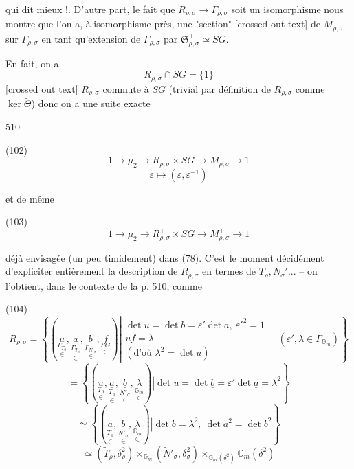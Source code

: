 \begin{enumerate}
qui dit mieux !. D'autre part, le fait
que $R_{\rho,\sigma} \to \Gamma_{\rho,\sigma}$ soit un isomorphisme
nous montre que l'on a, à isomorphisme
près, une "section" [crossed out text] de $M_{\rho,\sigma}$ sur $\Gamma_{\rho,\sigma}$ en tant
qu'extension de $\Gamma_{\rho,\sigma}$ par $\mathfrak{S}_{\rho,\sigma}^+ \simeq S G$.

En fait, on a
$$ R_{\rho,\sigma} \cap S G = \{1\} $$
[crossed out text]
$R_{\rho,\sigma}$ commute à $S G$
(trivial par définition de
$R_{\rho,\sigma}$ comme $\ker \tilde{\Theta}$)
donc on a une suite exacte

\newpage


510

(102)
$$ 1 \longrightarrow \mu_2 \longrightarrow R_{\rho,\sigma} \times S G \longrightarrow M_{\rho,\sigma} \longrightarrow 1 $$
$$ \varepsilon \longmapsto (\varepsilon, \varepsilon^{-1}) $$

et de même

(103)
$$ 1 \longrightarrow \mu_2 \longrightarrow R_{\rho,\sigma}^+ \times S G \longrightarrow M_{\rho,\sigma}^+ \longrightarrow 1 $$

déjà envisagée (un peu timidement) dans (78).
C'est le moment décidément d'expliciter
entièrement la description de $R_{\rho,\sigma}$ en
termes de $T_\rho, N_\sigma'...$ -- on l'obtient, dans
le contexte de la p. 510, comme

(104)
$$ R_{\rho,\sigma} = \left\{ (\underset{\in}{\underset{\Gamma_{T_0}}{u}}, \underset{\in}{\underset{\Gamma_{T_\rho}}{\underline{a}}}, \underset{\in}{\underset{\Gamma_{N'_\sigma}}{\underline{b}}}, \underset{\in}{\underset{SG}{f}}) \left| \begin{array}{l} \det u = \det \underline{b} = \varepsilon' \det \underline{a},\ \varepsilon'^2=1 \\ u f = \lambda \\ (\text{d'où } \lambda^2 = \det u) \end{array} \quad (\varepsilon',\lambda \in \Gamma_{\mathbb{G}_m}) \right. \right\} $$
$$ = \left\{ (\underset{\in}{\underset{T_0}{u}}, \underset{\in}{\underset{T_\rho}{\underline{a}}}, \underset{\in}{\underset{N'_\sigma}{\underline{b}}}, \underset{\in}{\underset{\mathbb{G}_m}{\lambda}}) \left| \det u = \det \underline{b} = \varepsilon' \det \underline{a} = \lambda^2 \right. \right\} $$
$$ \simeq \left\{ (\underset{\in}{\underset{T_\rho}{\underline{a}}}, \underset{\in}{\underset{N'_\sigma}{\underline{b}}}, \underset{\in}{\underset{\mathbb{G}_m}{\lambda}}) \left| \det \underline{b} = \lambda^2,\ \det \underline{a}^2 = \det \underline{b}^2 \right. \right\} $$
$$ \simeq (\widetilde{T}_\rho, \delta_\rho^2) \times_{\mathbb{G}_m} (\widetilde{N}'_\sigma, \delta_\sigma^2) \times_{\mathbb{G}_m (\delta^2)} \mathbb{G}_m (\delta^2) $$


\end{enumerate}
